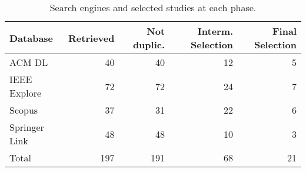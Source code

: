 \begin{table}[h]
    \begin{tabular}{l r r r r}
    \hline
    Database &        Retrieved & 
                                Not duplic. & 
                                         Interm. Selection & 
                                               Final Selection\\
    \hline
    ACM	DL			& 40 &      40 &     12  & 5 \\
    IEEE Explore	& 72 &      72 &     24  & 7 \\
    Scopus			& 37 &      31 &     22  & 6 \\
    Springer Link	& 48 &      48 &     10  & 3 \\
    \hline
    Total           & 197 &    191 &     68  & 21 \\
    \hline
    
    \end{tabular}
    \caption{Search engines and selected studies at each phase.}\label{tab:results}
\end{table}

